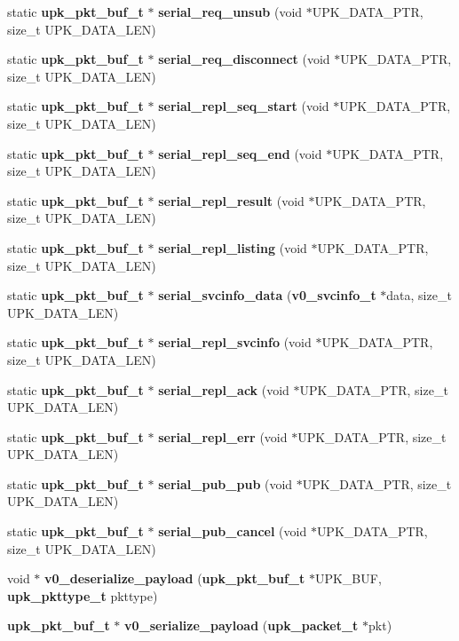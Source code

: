 \begin{DoxyCompactItemize}
\item 
static {\bf upk\_\-pkt\_\-buf\_\-t} $\ast$ {\bf serial\_\-req\_\-unsub} (void $\ast$UPK\_\-DATA\_\-PTR, size\_\-t UPK\_\-DATA\_\-LEN)
\item 
static {\bf upk\_\-pkt\_\-buf\_\-t} $\ast$ {\bf serial\_\-req\_\-disconnect} (void $\ast$UPK\_\-DATA\_\-PTR, size\_\-t UPK\_\-DATA\_\-LEN)
\item 
static {\bf upk\_\-pkt\_\-buf\_\-t} $\ast$ {\bf serial\_\-repl\_\-seq\_\-start} (void $\ast$UPK\_\-DATA\_\-PTR, size\_\-t UPK\_\-DATA\_\-LEN)
\item 
static {\bf upk\_\-pkt\_\-buf\_\-t} $\ast$ {\bf serial\_\-repl\_\-seq\_\-end} (void $\ast$UPK\_\-DATA\_\-PTR, size\_\-t UPK\_\-DATA\_\-LEN)
\item 
static {\bf upk\_\-pkt\_\-buf\_\-t} $\ast$ {\bf serial\_\-repl\_\-result} (void $\ast$UPK\_\-DATA\_\-PTR, size\_\-t UPK\_\-DATA\_\-LEN)
\item 
static {\bf upk\_\-pkt\_\-buf\_\-t} $\ast$ {\bf serial\_\-repl\_\-listing} (void $\ast$UPK\_\-DATA\_\-PTR, size\_\-t UPK\_\-DATA\_\-LEN)
\item 
static {\bf upk\_\-pkt\_\-buf\_\-t} $\ast$ {\bf serial\_\-svcinfo\_\-data} ({\bf v0\_\-svcinfo\_\-t} $\ast$data, size\_\-t UPK\_\-DATA\_\-LEN)
\item 
static {\bf upk\_\-pkt\_\-buf\_\-t} $\ast$ {\bf serial\_\-repl\_\-svcinfo} (void $\ast$UPK\_\-DATA\_\-PTR, size\_\-t UPK\_\-DATA\_\-LEN)
\item 
static {\bf upk\_\-pkt\_\-buf\_\-t} $\ast$ {\bf serial\_\-repl\_\-ack} (void $\ast$UPK\_\-DATA\_\-PTR, size\_\-t UPK\_\-DATA\_\-LEN)
\item 
static {\bf upk\_\-pkt\_\-buf\_\-t} $\ast$ {\bf serial\_\-repl\_\-err} (void $\ast$UPK\_\-DATA\_\-PTR, size\_\-t UPK\_\-DATA\_\-LEN)
\item 
static {\bf upk\_\-pkt\_\-buf\_\-t} $\ast$ {\bf serial\_\-pub\_\-pub} (void $\ast$UPK\_\-DATA\_\-PTR, size\_\-t UPK\_\-DATA\_\-LEN)
\item 
static {\bf upk\_\-pkt\_\-buf\_\-t} $\ast$ {\bf serial\_\-pub\_\-cancel} (void $\ast$UPK\_\-DATA\_\-PTR, size\_\-t UPK\_\-DATA\_\-LEN)
\item 
void $\ast$ {\bf v0\_\-deserialize\_\-payload} ({\bf upk\_\-pkt\_\-buf\_\-t} $\ast$UPK\_\-BUF, {\bf upk\_\-pkttype\_\-t} pkttype)
\item 
{\bf upk\_\-pkt\_\-buf\_\-t} $\ast$ {\bf v0\_\-serialize\_\-payload} ({\bf upk\_\-packet\_\-t} $\ast$pkt)
\end{DoxyCompactItemize}

